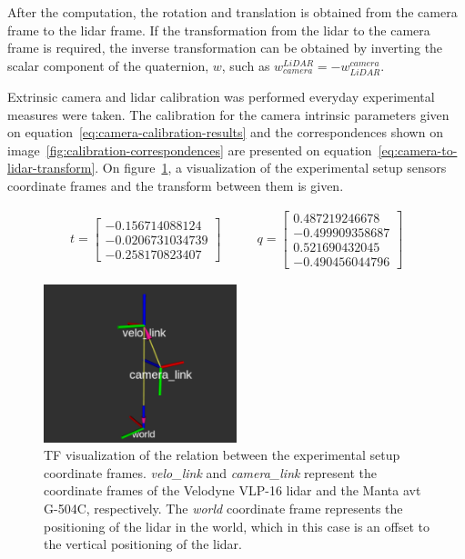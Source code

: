 After the computation, the rotation and translation is obtained from the camera frame to the \ac{lidar} frame. If the transformation from the \ac{lidar} to the camera frame is required, the inverse transformation can be obtained by inverting the scalar component of the quaternion, $w$, such as $w^{LiDAR}_{camera} = - w^{camera}_{LiDAR}$. 

Extrinsic camera and \ac{lidar} calibration was performed everyday  experimental measures were taken. The calibration for the camera intrinsic parameters given on equation~\ref{eq:camera-calibration-results} and the correspondences shown on image~\ref{fig:calibration-correspondences} are presented on equation~\ref{eq:camera-to-lidar-transform}. On figure~\ref{fig:extrinsic-calibration-frames}, a visualization of the experimental setup sensors coordinate frames and the transform between them is given.

\begin{subequations}
	\label{eq:camera-to-lidar-transform}
	\begin{align}
		t = \begin{bmatrix}
			-0.156714088124  \\
			-0.0206731034739 \\
			-0.258170823407
		\end{bmatrix}
		& \qquad
		q = \begin{bmatrix} 
		0.487219246678  \\
		-0.499909358687 \\
		0.521690432045  \\
		-0.490456044796
	\end{bmatrix}
	\end{align}
\end{subequations}

\begin{figure}[H]
	\centering
	\includegraphics[width=0.5\textwidth]{img/calibration/extrinsic-calibration-frames.png}
	\caption{TF visualization of the relation between the experimental setup coordinate frames. \emph{velo\_link} and \emph{camera\_link} represent the coordinate frames of the Velodyne VLP-16 \ac{lidar} and the Manta \ac{avt} G-504C, respectively. The \emph{world} coordinate frame represents the positioning of the \ac{lidar} in the world, which in this case is an offset to the vertical positioning of the \ac{lidar}.}
	\label{fig:extrinsic-calibration-frames}
\end{figure}

